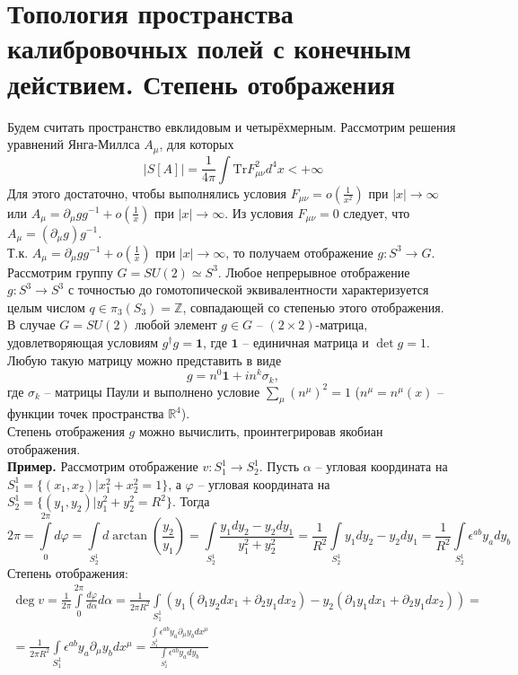 \documentclass[12pt]{article}
\theoremstyle{definition}
\begin{document}
\section{Топология пространства калибровочных полей с конечным действием. Степень отображения}
Будем считать пространство евклидовым и четырёхмерным. Рассмотрим решения уравнений Янга-Миллса $A_\mu$, для которых
\begin{equation}
    |S[A]|=\frac{1}{4\pi}\int\text{Tr}F_{\mu\nu}^2d^4x<+\infty
\end{equation}
Для этого достаточно, чтобы выполнялись условия $F_{\mu\nu}=o\left(\frac{1}{x^2}\right)$ при $|x|\rightarrow\infty$ или $A_\mu=\partial_\mu gg^{-1}+o\left(\frac{1}{x}\right)$ при $|x|\rightarrow\infty$. Из условия $F_{\mu\nu}=0$ следует, что $A_\mu=(\partial_\mu g)g^{-1}$.\\
Т.к. $A_\mu=\partial_\mu gg^{-1}+o\left(\frac{1}{x}\right)$ при $|x|\rightarrow\infty$, то получаем отображение $g:S^3\rightarrow G$. Рассмотрим группу $G=SU(2)\simeq S^3$. Любое непрерывное отображение $g:S^3\rightarrow S^3$ с точностью до гомотопической эквивалентности характеризуется целым числом $q\in\pi_3(S_3)=\mathbb{Z}$, совпадающей со степенью этого отображения.\\
В случае $G=SU(2)$ любой элемент $g\in G$ -- $(2\times2)$-матрица, удовлетворяющая условиям $g^\dagger g=\bm{1}$, где $\bm{1}$ -- единичная матрица и $\det g=1$. Любую такую матрицу можно представить в виде
\begin{equation}
    g=n^0\bm{1}+in^k\sigma_k,
\end{equation}
где $\sigma_k$ -- матрицы Паули и выполнено условие $\sum\limits_\mu(n^\mu)^2=1$ ($n^\mu=n^\mu(x)$ -- функции точек пространства $\mathbb{R}^4$).\\
Степень отображения $g$ можно вычислить, проинтегрировав якобиан отображения.\\
\textbf{Пример.} Рассмотрим отображение $v:S_1^1\rightarrow S_2^1$. Пусть $\alpha$ -- угловая координата на $S^1_1=\{(x_1,x_2)|x^2_1 + x^2_2 = 1\}$, а $\varphi$ -- угловая координата на $S^1_2=\{(y_1,y_2)|y^2_1+y^2_2=R^2\}$. Тогда
\begin{equation}
    2\pi=\int\limits_0^{2\pi}d\varphi=\int\limits_{S^1_2}d\arctan\left(\frac{y_2}{y_1}\right)=\int\limits_{S^1_2}\frac{y_1dy_2-y_2dy_1}{y_1^2+y_2^2}=\frac{1}{R^2}\int\limits_{S^1_2}y_1dy_2-y_2dy_1=\frac{1}{R^2}\int\limits_{S^1_2}\epsilon^{ab}y_ady_b
\end{equation}
Степень отображения:
\begin{multline}
    \deg v=\frac{1}{2\pi}\int\limits_0^{2\pi}\frac{d\varphi}{d\alpha}d\alpha=\frac{1}{2\pi R^2}\int\limits_{S_1^1}(y_1(\partial_1y_2dx_1+\partial_2 y_1dx_2)-y_2(\partial_1y_1dx_1+\partial_2y_1dx_2))=\\=\frac{1}{2\pi R^2}\int\limits_{S_1^1}\epsilon^{ab}y_a\partial_\mu y_bdx^\mu=\frac{\int\limits_{S_1^1}\epsilon^{ab}y_a\partial_\mu y_bdx^\mu}{\int\limits_{S^1_2}\epsilon^{ab}y_ady_b}
\end{multline}
\end{document}

